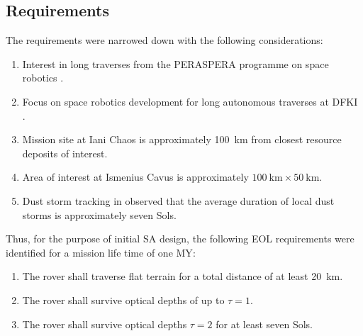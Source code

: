 
\subsection{Requirements}
\label{sec:sec:Design:RequirementsAndDesignDrivers:Requirements}
The requirements were narrowed down with the following considerations:

\begin{enumerate}[label=\textbf{\textcolor{BulletBlue}{(\alph*)}}]
    \item Interest in long traverses from the PERASPERA programme on space robotics .
    \item Focus on space robotics development for long autonomous traverses at \ac{DFKI}  .
    \item Mission site at Iani Chaos is approximately \SI{100}{\kilo\meter} from closest resource deposits of interest.
    \item Area of interest at Ismenius Cavus is approximately $\SI{100}{\kilo\meter} \times \SI{50}{\kilo\meter}$.
    \item Dust storm tracking in  observed that the average duration of local dust storms is approximately seven Sols.
\end{enumerate}

Thus, for the purpose of initial \ac{SA} design, the following \ac{EOL} requirements were identified for a mission life time of one \ac{MY}:

\begin{enumerate}[label=\textbf{\textcolor{BulletBlue}{R-\arabic*}}]
    \item \label{itm:req:total_distance_flat_terrain} The rover shall traverse flat terrain for a total distance of at least \SI{20}{\kilo\meter}.
    \item \label{itm:req:survive_tau1}The rover shall survive optical depths of up to $\tau = 1$.
    \item \label{itm:req:survice_tau2}The rover shall survive optical depths $\tau = 2$ for at least seven Sols.
\end{enumerate}

